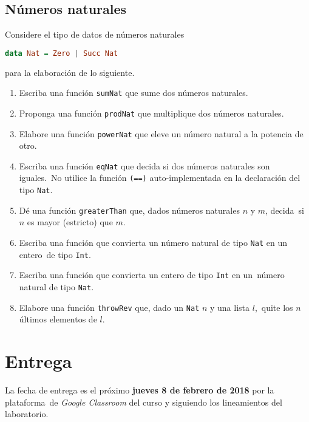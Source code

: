 \documentclass[paper=letter, fontsize=12pt]{scrartcl}
\begin{document}
\subsection{Números naturales}

\noindent
Considere el tipo de datos de números naturales
\begin{lstlisting}[language=Haskell]
  data Nat = Zero | Succ Nat  
\end{lstlisting}
para la elaboración de lo siguiente.

\begin{enumerate}[resume]
\item Escriba una función \verb+sumNat+ que sume dos números naturales.
\item Proponga una función \verb+prodNat+ que multiplique dos números naturales.
\item Elabore una función \verb+powerNat+ que eleve un número natural a la potencia de otro.
\item Escriba una función \verb+eqNat+ que decida si dos números naturales son iguales.\
  No utilice la función \verb+(==)+ auto-implementada en la declaración del tipo \verb+Nat+.
\item Dé una función \verb+greaterThan+ que, dados números naturales $n$ y $m$, decida\
  si $n$ es mayor (estricto) que $m$.
\item Escriba una función que convierta un número natural de tipo \verb+Nat+ en un entero\
  de tipo \verb+Int+.
\item Escriba una función que convierta un entero de tipo \verb+Int+ en un\
  número natural de tipo \verb+Nat+.
\item Elabore una función \verb+throwRev+ que, dado un \verb+Nat+ $n$ y una lista $l$,\
  quite los $n$ últimos elementos de $l$.
\end{enumerate}

\section{Entrega}

\noindent
La fecha de entrega es el próximo \textbf{jueves 8 de febrero de 2018} por la plataforma\
de \emph{Google Classroom} del curso y siguiendo los lineamientos del laboratorio.
\end{document}
